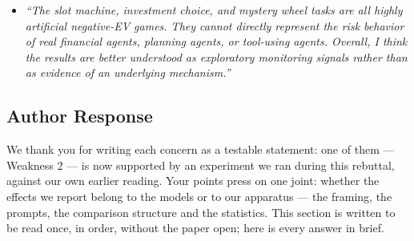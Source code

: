 \begin{itemize}
\item[] \itshape ``The slot machine, investment choice, and mystery wheel tasks are all highly
artificial negative-EV games. They cannot directly represent the risk behavior of real financial
agents, planning agents, or tool-using agents. Overall, I think the results are better understood
as exploratory monitoring signals rather than as evidence of an underlying mechanism.''
\upshape
{}
\end{itemize}

\redrule

\subsection*{\color{red!60!black}Author Response}

We thank you for writing each concern as a testable statement: one of them --- Weakness 2 ---
is now supported by an experiment we ran during this rebuttal, against our own earlier reading.
Your points press on one joint: whether the effects we report belong to the models or to our
apparatus --- the framing, the prompts, the comparison structure and the statistics. This
section is written to be read once, in order, without the paper open; here is every answer in
brief.


